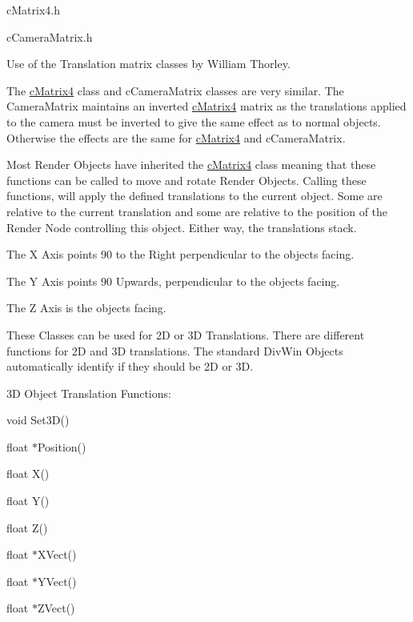\par
 cMatrix4.h \par
 cCameraMatrix.h \par
 \par
 Use of the Translation matrix classes by William Thorley. \par
 \par
 The \hyperlink{classc_matrix4}{cMatrix4} class and cCameraMatrix classes are very similar. The CameraMatrix maintains an inverted \hyperlink{classc_matrix4}{cMatrix4} matrix as the translations applied to the camera must be inverted to give the same effect as to normal objects. Otherwise the effects are the same for \hyperlink{classc_matrix4}{cMatrix4} and cCameraMatrix. \par
 Most Render Objects have inherited the \hyperlink{classc_matrix4}{cMatrix4} class meaning that these functions can be called to move and rotate Render Objects. Calling these functions, will apply the defined translations to the current object. Some are relative to the current translation and some are relative to the position of the Render Node controlling this object. Either way, the translations stack. \par
 \par
 The X Axis points 90 to the Right perpendicular to the objects facing. \par
 The Y Axis points 90 Upwards, perpendicular to the objects facing. \par
 The Z Axis is the objects facing. \par
 \par
 These Classes can be used for 2D or 3D Translations. There are different functions for 2D and 3D translations. The standard DivWin Objects automatically identify if they should be 2D or 3D. \par
 \par
 3D Object Translation Functions: \par
 void Set3D() \par
 \par
 float $\ast$Position() \par
 float X() \par
 float Y() \par
 float Z() \par
 \par
 float $\ast$XVect() \par
 float $\ast$YVect() \par
 float $\ast$ZVect() \par
 \par
